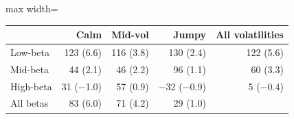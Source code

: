 {\small
\begin{adjustbox}{max width=\linewidth}
\begin{tabular}{lrrrr}
\toprule
 & Calm & Mid-vol & Jumpy & All volatilities \\
\midrule
Low-beta & 123 (6.6) & 116 (3.8) & 130 (2.4) & 122 (5.6) \\
Mid-beta & 44 (2.1) & 46 (2.2) & 96 (1.1) & 60 (3.3) \\
High-beta & 31 ($-$1.0) & 57 (0.9) & $-$32 ($-$0.9) & 5 ($-$0.4) \\
\midrule
All betas & 83 (6.0) & 71 (4.2) & 29 (1.0) &  \\
\bottomrule
\end{tabular}
\end{adjustbox}
}

